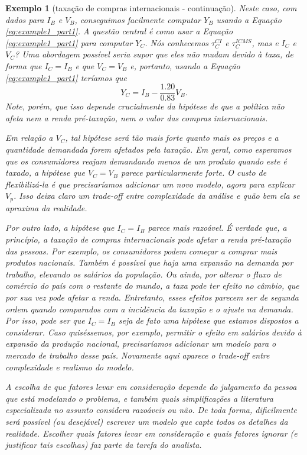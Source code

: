 \documentclass[12pt]{article}
\theoremstyle{break}
\newtheorem{exemplo}{Exemplo}
\begin{document}
\begin{exemplo}[taxação de compras internacionais - continuação]
Neste caso, com dados para $I_B$ e $V_B$, conseguimos facilmente computar $Y_B$ usando a Equação \eqref{eq:example1_part1}. A questão central é como usar a Equação \eqref{eq:example1_part1} para computar $Y_C$. Nós conhecemos $\tau^{CI}_C$ e $\tau^{ICMS}_C$, mas e $I_C$ e $V_C$? Uma abordagem possível seria supor que eles não mudam devido à taxa, de forma que $I_C=I_B$ e que $V_C=V_B$ e, portanto, usando a Equação \eqref{eq:example1_part1} teríamos que
\begin{equation}
\label{eq:determisitic_ci}
Y_C=I_B - \frac{1.20}{0.83}V_B.
\end{equation}
Note, porém, que isso depende crucialmente da hipótese de que a política não afeta nem a renda pré-taxação, nem o valor das compras internacionais. 

Em relação a $V_C$, tal hipótese será tão mais forte quanto mais  os preços e a quantidade demandada forem afetados pela taxação. Em geral, como esperamos que os consumidores reajam demandando menos de um produto quando este é taxado, a hipótese que $V_C=V_B$ parece particularmente forte. O custo de flexibilizá-la é que precisaríamos adicionar um novo modelo, agora para explicar $V_p$. Isso deixa claro um trade-off entre complexidade da análise e quão bem ela se aproxima da realidade. 

Por outro lado, a hipótese que $I_C=I_B$ parece mais razoável. É verdade que, a princípio, a taxação de compras internacionais pode afetar a renda pré-taxação das pessoas. Por exemplo, os consumidores podem começar a comprar mais produtos nacionais. Também é possível que haja uma expansão na demanda por trabalho, elevando os salários da população. Ou ainda, por alterar o fluxo de comércio do país com o restante do mundo, a taxa pode ter efeito no câmbio, que por sua vez pode afetar a renda. Entretanto, esses efeitos parecem ser de segunda ordem quando comparados com a incidência da taxação e o ajuste na demanda. Por isso, pode ser que $I_C=I_B$ seja de fato uma hipótese que estamos dispostos a considerar. Caso quiséssemos, por exemplo, permitir o efeito em salários devido à expansão da produção nacional, precisaríamos adicionar um modelo para o mercado de trabalho desse país. Novamente aqui aparece o trade-off entre complexidade e realismo do modelo.

A escolha de que fatores levar em consideração depende do julgamento da pessoa que está modelando o problema, e também quais simplificações a literatura especializada no assunto considera razoáveis ou não. De toda forma, dificilmente será possível (ou desejável) escrever um modelo que capte todos os detalhes da realidade. Escolher quais fatores levar em consideração e quais fatores ignorar (e justificar tais escolhas) faz parte da tarefa do analista. 
\end{exemplo}
\end{document}
